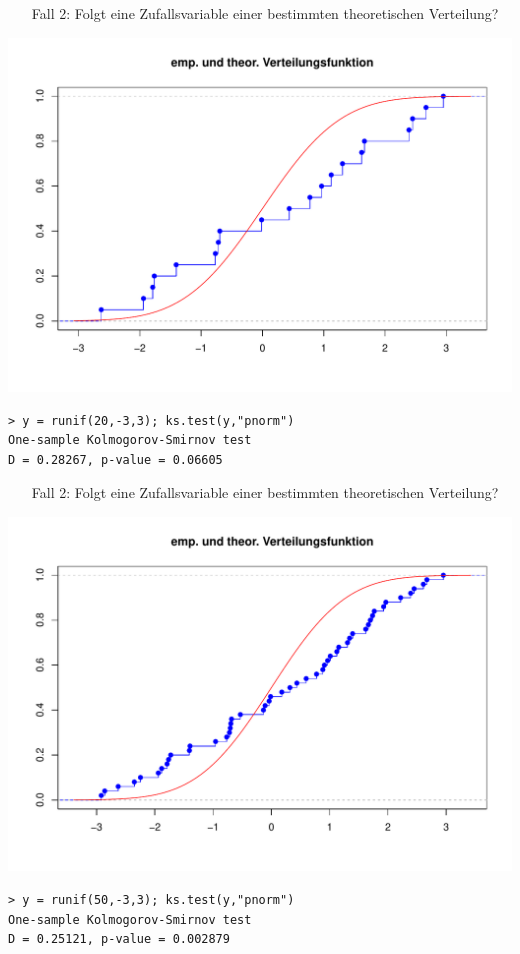 \documentclass[t,11pt,aspectratio=169]{beamer}
\begin{document}
\begin{frame}[fragile]
\begin{enumerate}
	\item[Fall 2:] Folgt eine Zufallsvariable einer bestimmten theoretischen Verteilung?
\end{enumerate}
\begin{center}
	\includegraphics[scale=0.3]{Rplot03.pdf}
\end{center}
\begin{verbatim}
> y = runif(20,-3,3); ks.test(y,"pnorm")
One-sample Kolmogorov-Smirnov test
D = 0.28267, p-value = 0.06605
\end{verbatim}
\end{frame}

\begin{frame}[fragile]
\begin{enumerate}
	\item[Fall 2:] Folgt eine Zufallsvariable einer bestimmten theoretischen Verteilung?
\end{enumerate}
\begin{center}
	\includegraphics[scale=0.3]{Rplot04.pdf}
\end{center}
\begin{verbatim}
> y = runif(50,-3,3); ks.test(y,"pnorm")
One-sample Kolmogorov-Smirnov test
D = 0.25121, p-value = 0.002879
\end{verbatim}
\end{frame}
\end{document}
